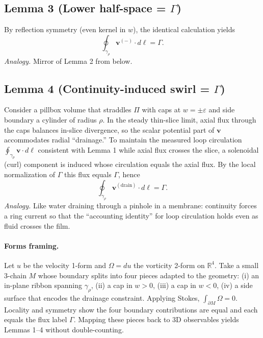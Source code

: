 \documentclass[11pt]{article}
\begin{document}
\subsection*{Lemma 3 (Lower half-space = $\Gamma$)}
By reflection symmetry (even kernel in $w$), the identical calculation yields
\[
\oint_{\gamma_\rho}\bm v^{(-)}\cdot d\bm\ell = \Gamma.
\]
\textit{Analogy.} Mirror of Lemma 2 from below.

\subsection*{Lemma 4 (Continuity-induced swirl = $\Gamma$)}
Consider a pillbox volume that straddles $\Pi$ with caps at $w=\pm\varepsilon$ and side boundary a cylinder of radius $\rho$. In the steady thin-slice limit, axial flux through the caps balances in-slice divergence, so the scalar potential part of $\bm v$ accommodates radial ``drainage.'' To maintain the measured loop circulation $\oint_{\gamma_\rho}\bm v\cdot d\ell$ consistent with Lemma 1 while axial flux crosses the slice, a solenoidal (curl) component is induced whose circulation equals the axial flux. By the local normalization of $\Gamma$ this flux equals $\Gamma$, hence
\[
\oint_{\gamma_\rho}\bm v^{(\mathrm{drain})}\cdot d\bm\ell=\Gamma.
\]
\textit{Analogy.} Like water draining through a pinhole in a membrane: continuity forces a ring current so that the ``accounting identity'' for loop circulation holds even as fluid crosses the film.

\paragraph{Forms framing.} Let $u$ be the velocity 1-form and $\Omega=du$ the vorticity 2-form on $\mathbb R^4$. Take a small 3-chain $M$ whose boundary splits into four pieces adapted to the geometry: (i) an in-plane ribbon spanning $\gamma_\rho$, (ii) a cap in $w>0$, (iii) a cap in $w<0$, (iv) a side surface that encodes the drainage constraint. Applying Stokes, $\int_{\partial M}\Omega=0$. Locality and symmetry show the four boundary contributions are equal and each equals the flux label $\Gamma$. Mapping these pieces back to 3D observables yields Lemmas 1–4 without double-counting.
\end{document}
